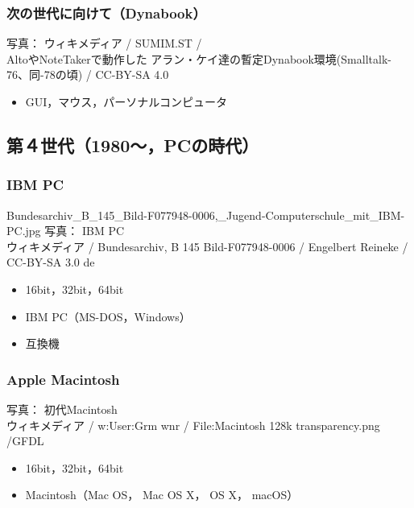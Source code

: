 \documentclass[unicode]{beamer}                   %
\begin{document}
\begin{frame}
  \frametitle{次の世代に向けて（Dynabook）}
        {\tiny 写真： ウィキメディア /  SUMIM.ST / \\
          AltoやNoteTakerで動作した
          アラン・ケイ達の暫定Dynabook環境(Smalltalk-76、同-78の頃) /
          CC-BY-SA 4.0}
  \begin{itemize}
    \item GUI，マウス，パーソナルコンピュータ
  \end{itemize}
  \vfill
\end{frame}

\subsection{第４世代（1980〜，PCの時代）}
\begin{frame}
  \frametitle{IBM PC}
{Bundesarchiv_B_145_Bild-F077948-0006,_Jugend-Computerschule_mit_IBM-PC.jpg}
      {\tiny
          写真： IBM PC \\
          ウィキメディア /
          Bundesarchiv, B 145 Bild-F077948-0006 /
          Engelbert Reineke / CC-BY-SA 3.0 de
      }
  \begin{itemize}
    \item 16bit，32bit，64bit
    \item IBM PC（MS-DOS，Windows）
    \item 互換機
  \end{itemize}
  \vfill
\end{frame}

\begin{frame}
  \frametitle{Apple Macintosh}
      {\tiny
          写真： 初代Macintosh \\
          ウィキメディア / w:User:Grm wnr / 
          File:Macintosh 128k transparency.png /GFDL
      }
  \begin{itemize}
    \item 16bit，32bit，64bit
    \item Macintosh（Mac OS， Mac OS X， OS X， macOS）
  \end{itemize}
  \vfill
\end{frame}
\end{document}
